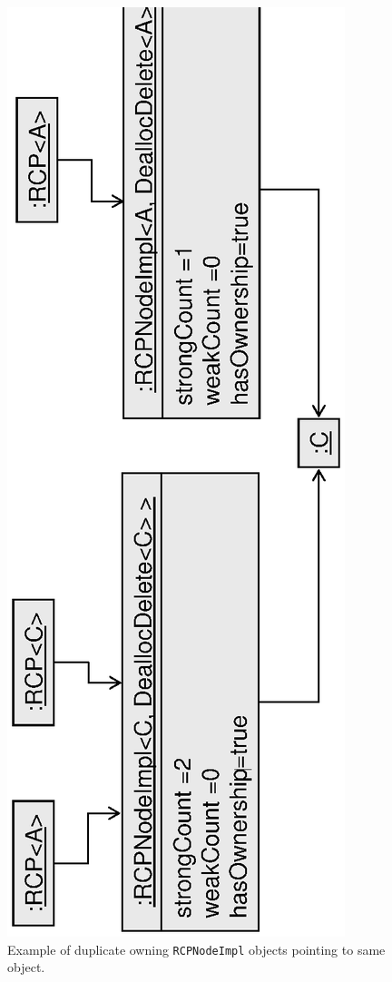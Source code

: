 \documentclass[pdf,ps2pdf,11pt]{SANDreport}
\begin{document}
{\bsinglespace
\begin{figure}
\begin{center}
\includegraphics*[angle=270,scale=0.65]{RCPEx2}
\end{center}
\caption{
\label{fig:RCPEx2}
Example of duplicate owning {}\texttt{RCPNodeImpl} objects pointing to
same object. }
\end{figure}
\esinglespace}
\end{document}
